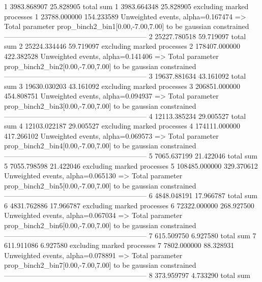 1          3983.868907     25.828905       total sum                     
1          3983.664348     25.828905       excluding marked processes    
1          23788.000000    154.233589      Unweighted events, alpha=0.167474
  => Total parameter prop_binch2_bin1[0.00,-7.00,7.00] to be gaussian constrained
------------------------------------------------------------
2          25227.780518    59.719097       total sum                     
2          25224.334446    59.719097       excluding marked processes    
2          178407.000000   422.382528      Unweighted events, alpha=0.141406
  => Total parameter prop_binch2_bin2[0.00,-7.00,7.00] to be gaussian constrained
------------------------------------------------------------
3          19637.881634    43.161092       total sum                     
3          19630.030203    43.161092       excluding marked processes    
3          206851.000000   454.808751      Unweighted events, alpha=0.094937
  => Total parameter prop_binch2_bin3[0.00,-7.00,7.00] to be gaussian constrained
------------------------------------------------------------
4          12113.385234    29.005527       total sum                     
4          12103.022187    29.005527       excluding marked processes    
4          174111.000000   417.266102      Unweighted events, alpha=0.069573
  => Total parameter prop_binch2_bin4[0.00,-7.00,7.00] to be gaussian constrained
------------------------------------------------------------
5          7065.637199     21.422046       total sum                     
5          7055.798598     21.422046       excluding marked processes    
5          108485.000000   329.370612      Unweighted events, alpha=0.065130
  => Total parameter prop_binch2_bin5[0.00,-7.00,7.00] to be gaussian constrained
------------------------------------------------------------
6          4848.048191     17.966787       total sum                     
6          4831.762886     17.966787       excluding marked processes    
6          72322.000000    268.927500      Unweighted events, alpha=0.067034
  => Total parameter prop_binch2_bin6[0.00,-7.00,7.00] to be gaussian constrained
------------------------------------------------------------
7          615.509750      6.927580        total sum                     
7          611.911086      6.927580        excluding marked processes    
7          7802.000000     88.328931       Unweighted events, alpha=0.078891
  => Total parameter prop_binch2_bin7[0.00,-7.00,7.00] to be gaussian constrained
------------------------------------------------------------
8          373.959797      4.733290        total sum                     
